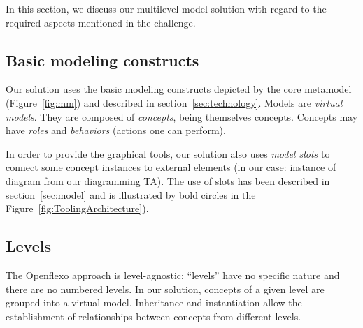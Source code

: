 In this section, we discuss our multilevel model solution with regard to the required aspects 
mentioned in the challenge.


  \subsection{Basic modeling constructs}


  Our solution uses the basic modeling constructs depicted by the \FML core
  metamodel (Figure~\ref{fig:mm}) and described in
  section~\ref{sec:technology}. Models are \emph{virtual models}. They are
  composed of \emph{concepts}, being themselves concepts. Concepts may have
  \emph{roles} and \emph{behaviors} (actions one can perform).

  In order to provide the graphical tools, our solution also uses \emph{model
  slots} to connect some concept instances to external elements (in our case:
  instance of diagram from our diagramming TA). The use of slots has been
  described in section~\ref{sec:model} and is illustrated by bold circles in
  the Figure~\ref{fig:ToolingArchitecture}).


  \subsection{Levels}


  The Openflexo approach is level-agnostic: ``levels'' have no specific nature
  and there are no numbered levels. In our solution, concepts of a given level
  are grouped into a virtual model. Inheritance and instantiation allow the
  establishment of relationships between concepts from different levels.

